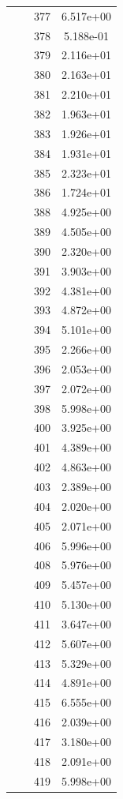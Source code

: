 \documentclass[12pt]{article}
\begin{document}
\begin{longtable}{@{}cccc@{}}
 &  & 377 & 6.517e+00 \\
 &  & 378 & 5.188e-01 \\
 &  & 379 & 2.116e+01 \\
 &  & 380 & 2.163e+01 \\
 &  & 381 & 2.210e+01 \\
 &  & 382 & 1.963e+01 \\
 &  & 383 & 1.926e+01 \\
 &  & 384 & 1.931e+01 \\
 &  & 385 & 2.323e+01 \\
 &  & 386 & 1.724e+01 \\
 &  & 388 & 4.925e+00 \\
 &  & 389 & 4.505e+00 \\
 &  & 390 & 2.320e+00 \\
 &  & 391 & 3.903e+00 \\
 &  & 392 & 4.381e+00 \\
 &  & 393 & 4.872e+00 \\
 &  & 394 & 5.101e+00 \\
 &  & 395 & 2.266e+00 \\
 &  & 396 & 2.053e+00 \\
 &  & 397 & 2.072e+00 \\
 &  & 398 & 5.998e+00 \\
 &  & 400 & 3.925e+00 \\
 &  & 401 & 4.389e+00 \\
 &  & 402 & 4.863e+00 \\
 &  & 403 & 2.389e+00 \\
 &  & 404 & 2.020e+00 \\
 &  & 405 & 2.071e+00 \\
 &  & 406 & 5.996e+00 \\
 &  & 408 & 5.976e+00 \\
 &  & 409 & 5.457e+00 \\
 &  & 410 & 5.130e+00 \\
 &  & 411 & 3.647e+00 \\
 &  & 412 & 5.607e+00 \\
 &  & 413 & 5.329e+00 \\
 &  & 414 & 4.891e+00 \\
 &  & 415 & 6.555e+00 \\
 &  & 416 & 2.039e+00 \\
 &  & 417 & 3.180e+00 \\
 &  & 418 & 2.091e+00 \\
 &  & 419 & 5.998e+00 \\

\end{longtable}
\end{document}
